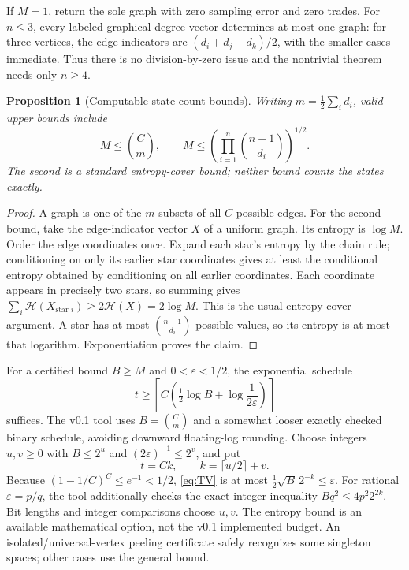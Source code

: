 \documentclass[11pt]{article}
\newtheorem{proposition}[theorem]{Proposition}
\begin{document}
If $M=1$, return the sole graph with zero sampling error and zero trades. For $n\le3$, every labeled graphical degree vector determines at most one graph: for three vertices, the edge indicators are $(d_i+d_j-d_k)/2$, with the smaller cases immediate. Thus there is no division-by-zero issue and the nontrivial theorem needs only $n\ge4$.

\begin{proposition}[Computable state-count bounds]\label{prop:count}
Writing $m=\frac12\sum_i d_i$, valid upper bounds include
\begin{equation}\label{eq:count}
 M\le {C\choose m},\qquad
 M\le\left(\prod_{i=1}^n {n-1\choose d_i}\right)^{1/2}.
\end{equation}
The second is a standard entropy-cover bound; neither bound counts the states exactly.
\end{proposition}
\begin{proof}
A graph is one of the $m$-subsets of all $C$ possible edges. For the second bound, take the edge-indicator vector $X$ of a uniform graph. Its entropy is $\log M$. Order the edge coordinates once. Expand each star's entropy by the chain rule; conditioning on only its earlier star coordinates gives at least the conditional entropy obtained by conditioning on all earlier coordinates. Each coordinate appears in precisely two stars, so summing gives $\sum_i\mathcal H(X_{\text{star }i})\ge2\mathcal H(X)=2\log M$. This is the usual entropy-cover argument. A star has at most $\binom{n-1}{d_i}$ possible values, so its entropy is at most that logarithm. Exponentiation proves the claim.
\end{proof}

For a certified bound $B\ge M$ and $0<\varepsilon<1/2$, the exponential schedule
\begin{equation}\label{eq:exp}
 t\ge\left\lceil C\left(\tfrac12\log B+\log\frac1{2\varepsilon}\right)\right\rceil
\end{equation}
suffices. The v0.1 tool uses $B=\binom Cm$ and a somewhat looser exactly checked binary schedule, avoiding downward floating-log rounding. Choose integers $u,v\ge0$ with $B\le2^u$ and $(2\varepsilon)^{-1}\le2^v$, and put
\begin{equation}\label{eq:binary}
 t=Ck,\qquad k=\lceil u/2\rceil+v.
\end{equation}
Because $(1-1/C)^C\le e^{-1}<1/2$, \eqref{eq:TV} is at most $\frac12\sqrt B\,2^{-k}\le\varepsilon$. For rational $\varepsilon=p/q$, the tool additionally checks the exact integer inequality $Bq^2\le4p^2 2^{2k}$. Bit lengths and integer comparisons choose $u,v$. The entropy bound is an available mathematical option, not the v0.1 implemented budget. An isolated/universal-vertex peeling certificate safely recognizes some singleton spaces; other cases use the general bound.
\end{document}
